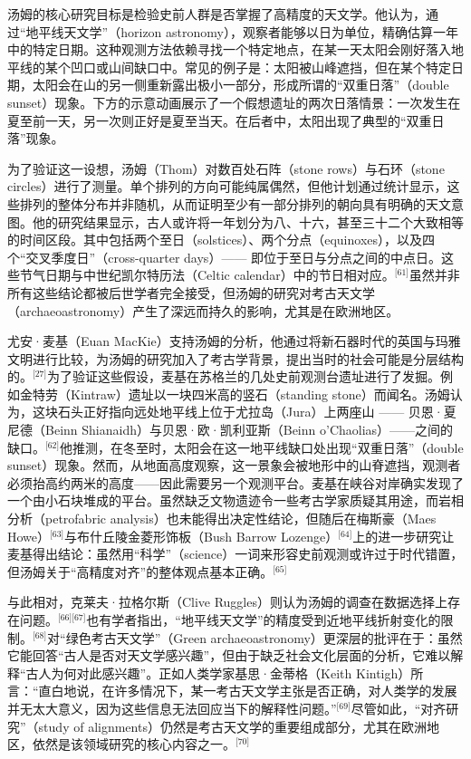 汤姆的核心研究目标是检验史前人群是否掌握了高精度的天文学。他认为，通过“地平线天文学”（horizon astronomy），观察者能够以日为单位，精确估算一年中的特定日期。这种观测方法依赖寻找一个特定地点，在某一天太阳会刚好落入地平线的某个凹口或山间缺口中。常见的例子是：太阳被山峰遮挡，但在某个特定日期，太阳会在山的另一侧重新露出极小一部分，形成所谓的“双重日落”（double sunset）现象。下方的示意动画展示了一个假想遗址的两次日落情景：一次发生在夏至前一天，另一次则正好是夏至当天。在后者中，太阳出现了典型的“双重日落”现象。

为了验证这一设想，汤姆（Thom）对数百处石阵（stone rows）与石环（stone circles）进行了测量。单个排列的方向可能纯属偶然，但他计划通过统计显示，这些排列的整体分布并非随机，从而证明至少有一部分排列的朝向具有明确的天文意图。他的研究结果显示，古人或许将一年划分为八、十六，甚至三十二个大致相等的时间区段。其中包括两个至日（solstices）、两个分点（equinoxes），以及四个“交叉季度日”（cross-quarter days）—— 即位于至日与分点之间的中点日。这些节气日期与中世纪凯尔特历法（Celtic calendar）中的节日相对应。\(^\text{[61]}\)虽然并非所有这些结论都被后世学者完全接受，但汤姆的研究对考古天文学（archaeoastronomy）产生了深远而持久的影响，尤其是在欧洲地区。

尤安·麦基（Euan MacKie）支持汤姆的分析，他通过将新石器时代的英国与玛雅文明进行比较，为汤姆的研究加入了考古学背景，提出当时的社会可能是分层结构的。\(^\text{[27]}\)为了验证这些假设，麦基在苏格兰的几处史前观测台遗址进行了发掘。例如金特劳（Kintraw）遗址以一块四米高的竖石（standing stone）而闻名。汤姆认为，这块石头正好指向远处地平线上位于尤拉岛（Jura）上两座山 —— 贝恩·夏尼德（Beinn Shianaidh）与贝恩·欧·凯利亚斯（Beinn o’Chaolias）——之间的缺口。\(^\text{[62]}\)他推测，在冬至时，太阳会在这一地平线缺口处出现“双重日落”（double sunset）现象。然而，从地面高度观察，这一景象会被地形中的山脊遮挡，观测者必须抬高约两米的高度——因此需要另一个观测平台。麦基在峡谷对岸确实发现了一个由小石块堆成的平台。虽然缺乏文物遗迹令一些考古学家质疑其用途，而岩相分析（petrofabric analysis）也未能得出决定性结论，但随后在梅斯豪（Maes Howe）\(^\text{[63]}\)与布什丘陵金菱形饰板（Bush Barrow Lozenge）\(^\text{[64]}\)上的进一步研究让麦基得出结论：虽然用“科学”（science）一词来形容史前观测或许过于时代错置，但汤姆关于“高精度对齐”的整体观点基本正确。\(^\text{[65]}\)

与此相对，克莱夫·拉格尔斯（Clive Ruggles）则认为汤姆的调查在数据选择上存在问题。\(^\text{[66][67]}\)也有学者指出，“地平线天文学”的精度受到近地平线折射变化的限制。\(^\text{[68]}\)对“绿色考古天文学”（Green archaeoastronomy）更深层的批评在于：虽然它能回答“古人是否对天文学感兴趣”，但由于缺乏社会文化层面的分析，它难以解释“古人为何对此感兴趣”。正如人类学家基思·金蒂格（Keith Kintigh）所言：“直白地说，在许多情况下，某一考古天文学主张是否正确，对人类学的发展并无太大意义，因为这些信息无法回应当下的解释性问题。”\(^\text{[69]}\)尽管如此，“对齐研究”（study of alignments）仍然是考古天文学的重要组成部分，尤其在欧洲地区，依然是该领域研究的核心内容之一。\(^\text{[70]}\)
